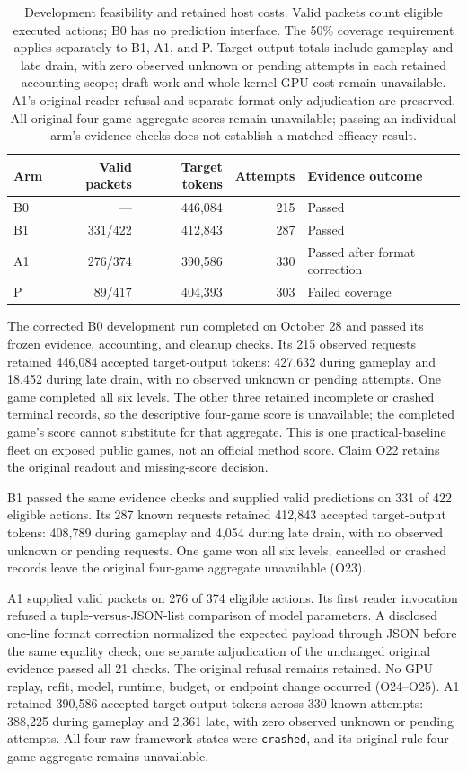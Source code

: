 \documentclass[11pt]{article}
\begin{document}
\begin{table}[htbp]
\centering
\small
\begin{tabular}{@{}lrrrl@{}}
\toprule
Arm & Valid packets & Target tokens & Attempts & Evidence outcome \\
\midrule
B0 & --- & 446,084 & 215 & Passed \\
B1 & 331/422 & 412,843 & 287 & Passed \\
A1 & 276/374 & 390,586 & 330 & Passed after format correction \\
P  & 89/417 & 404,393 & 303 & Failed coverage \\
\bottomrule
\end{tabular}
\caption{Development feasibility and retained host costs. Valid packets count eligible executed actions; B0 has no prediction interface. The 50\% coverage requirement applies separately to B1, A1, and P. Target-output totals include gameplay and late drain, with zero observed unknown or pending attempts in each retained accounting scope; draft work and whole-kernel GPU cost remain unavailable. A1's original reader refusal and separate format-only adjudication are preserved. All original four-game aggregate scores remain unavailable; passing an individual arm's evidence checks does not establish a matched efficacy result.}
\label{tab:dev-feasibility}
\end{table}

The corrected B0 development run completed on October 28 and passed its frozen evidence, accounting, and cleanup checks. Its 215 observed requests retained 446,084 accepted target-output tokens: 427,632 during gameplay and 18,452 during late drain, with no observed unknown or pending attempts. One game completed all six levels. The other three retained incomplete or crashed terminal records, so the descriptive four-game score is unavailable; the completed game's score cannot substitute for that aggregate. This is one practical-baseline fleet on exposed public games, not an official method score. Claim O22 retains the original readout and missing-score decision.

B1 passed the same evidence checks and supplied valid predictions on 331 of 422 eligible actions. Its 287 known requests retained 412,843 accepted target-output tokens: 408,789 during gameplay and 4,054 during late drain, with no observed unknown or pending requests. One game won all six levels; cancelled or crashed records leave the original four-game aggregate unavailable (O23).

A1 supplied valid packets on 276 of 374 eligible actions. Its first reader invocation refused a tuple-versus-JSON-list comparison of model parameters. A disclosed one-line format correction normalized the expected payload through JSON before the same equality check; one separate adjudication of the unchanged original evidence passed all 21 checks. The original refusal remains retained. No GPU replay, refit, model, runtime, budget, or endpoint change occurred (O24--O25). A1 retained 390,586 accepted target-output tokens across 330 known attempts: 388,225 during gameplay and 2,361 late, with zero observed unknown or pending attempts. All four raw framework states were \texttt{crashed}, and its original-rule four-game aggregate remains unavailable.
\end{document}
